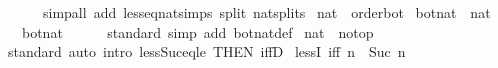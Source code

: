 \begin{isabellebody}
\ \ \ \ \ \ {\isacharparenleft}{\kern0pt}simp{\isacharunderscore}{\kern0pt}all\ add{\isacharcolon}{\kern0pt}\ less{\isacharunderscore}{\kern0pt}eq{\isacharunderscore}{\kern0pt}nat{\isachardot}{\kern0pt}simps{\isacharparenleft}{\kern0pt}{}{\isacharparenright}{\kern0pt}\ split{\isacharcolon}{\kern0pt}\ nat{\isachardot}{\kern0pt}splits{\isacharparenright}{\kern0pt}\isanewline
{}\isamarkupfalse%
%
\endisatagproof
{\isafoldproof}%
%
\isadelimproof
\isanewline
%
\endisadelimproof
\isanewline
{}\isamarkupfalse%
\isanewline
\isanewline
{}\isamarkupfalse%
\ nat\ {\isacharcolon}{\kern0pt}{\isacharcolon}{\kern0pt}\ order{\isacharunderscore}{\kern0pt}bot\isanewline
{}\isanewline
\isanewline
{}\isamarkupfalse%
\ bot{\isacharunderscore}{\kern0pt}nat\ {\isacharcolon}{\kern0pt}{\isacharcolon}{\kern0pt}\ nat\isanewline
\ \ \ {\isachardoublequoteopen}bot{\isacharunderscore}{\kern0pt}nat\ {\isacharequal}{\kern0pt}\ {}{\isachardoublequoteclose}\isanewline
\isanewline
{}\isamarkupfalse%
\isanewline
%
\isadelimproof
\ \ %
\endisadelimproof
%
\isatagproof
{}\isamarkupfalse%
\ standard\ {\isacharparenleft}{\kern0pt}simp\ add{\isacharcolon}{\kern0pt}\ bot{\isacharunderscore}{\kern0pt}nat{\isacharunderscore}{\kern0pt}def{\isacharparenright}{\kern0pt}%
\endisatagproof
{\isafoldproof}%
%
\isadelimproof
\isanewline
%
\endisadelimproof
\isanewline
{}\isamarkupfalse%
\isanewline
\isanewline
{}\isamarkupfalse%
\ nat\ {\isacharcolon}{\kern0pt}{\isacharcolon}{\kern0pt}\ no{\isacharunderscore}{\kern0pt}top\isanewline
%
\isadelimproof
\ \ %
\endisadelimproof
%
\isatagproof
{}\isamarkupfalse%
\ standard\ {\isacharparenleft}{\kern0pt}auto\ intro{\isacharcolon}{\kern0pt}\ less{\isacharunderscore}{\kern0pt}Suc{\isacharunderscore}{\kern0pt}eq{\isacharunderscore}{\kern0pt}le\ {\isacharbrackleft}{\kern0pt}THEN\ iffD{}{\isacharbrackright}{\kern0pt}{\isacharparenright}{\kern0pt}%
\endisatagproof
{\isafoldproof}%
%
\isadelimproof
%
\endisadelimproof
%
\isadelimdocument
%
\endisadelimdocument
%
\isatagdocument
%
\isamarkuptrue%
%
\endisatagdocument
{\isafolddocument}%
%
\isadelimdocument
%
\endisadelimdocument
{}\isamarkupfalse%
\ lessI\ {\isacharbrackleft}{\kern0pt}iff{\isacharbrackright}{\kern0pt}{\isacharcolon}{\kern0pt}\ {\isachardoublequoteopen}n\ {\isacharless}{\kern0pt}\ Suc\ n{\isachardoublequoteclose}\isanewline

\end{isabellebody}
